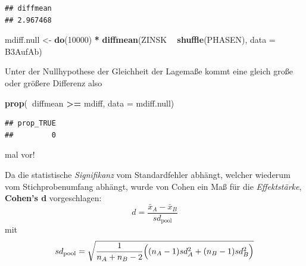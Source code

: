\documentclass[12pt,ngerman,paper=a4,pagesize,DIV=13]{scrreprt}
\newenvironment{Shaded}{\begin{snugshade}}{\end{snugshade}}
\newcommand{\DataTypeTok}[1]{\textcolor[rgb]{0.13,0.29,0.53}{#1}}
\newcommand{\DecValTok}[1]{\textcolor[rgb]{0.00,0.00,0.81}{#1}}
\newcommand{\KeywordTok}[1]{\textcolor[rgb]{0.13,0.29,0.53}{\textbf{#1}}}
\newcommand{\NormalTok}[1]{#1}
\newcommand{\OperatorTok}[1]{\textcolor[rgb]{0.81,0.36,0.00}{\textbf{#1}}}
\newcommand{\StringTok}[1]{\textcolor[rgb]{0.31,0.60,0.02}{#1}}
\begin{document}
\begin{verbatim}
## diffmean 
## 2.967468
\end{verbatim}

\begin{Shaded}
\begin{Highlighting}[]
\NormalTok{mdiff.null <-}\StringTok{ }\KeywordTok{do}\NormalTok{(}\DecValTok{10000}\NormalTok{) }\OperatorTok{*}\StringTok{ }\KeywordTok{diffmean}\NormalTok{(ZINSK }\OperatorTok{~}\StringTok{ }\KeywordTok{shuffle}\NormalTok{(PHASEN), }\DataTypeTok{data =}\NormalTok{ B3AufAb)}
\end{Highlighting}
\end{Shaded}

Unter der Nullhypothese der Gleichheit der Lagemaße kommt eine gleich
große oder größere Differenz also

\begin{Shaded}
\begin{Highlighting}[]
\KeywordTok{prop}\NormalTok{(}\OperatorTok{~}\NormalTok{diffmean }\OperatorTok{>=}\StringTok{ }\NormalTok{mdiff, }\DataTypeTok{data =}\NormalTok{ mdiff.null)}
\end{Highlighting}
\end{Shaded}

\begin{verbatim}
## prop_TRUE 
##         0
\end{verbatim}

mal vor!

Da die statistische \emph{Signifikanz} vom Standardfehler abhängt,
welcher wiederum vom Stichprobenumfang abhängt, wurde von Cohen ein Maß
für die \emph{Effektstärke}, \textbf{Cohen's d} vorgeschlagen:
\[d=\frac{\bar{x}_A-\bar{x}_B}{sd_{\text{pool}}}\] mit
\[{sd_{\text{pool}}=\sqrt{\frac{1}{n_A+n_B-2}\Bigl((n_A-1)sd^2_A+(n_B-1)sd^2_B \Bigr)}}\]
\end{document}
